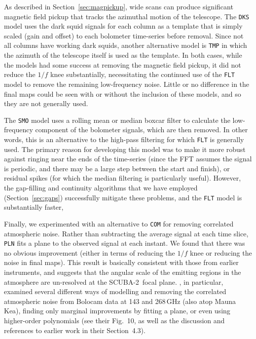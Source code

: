 \documentclass[useAMS,usenatbib,nofootinbib]{mn2e}
\newcommand{\scuba}{SCUBA-2}
\newcommand{\model}[1]{\texttt{#1}}
\begin{document}
As described in Section~\ref{sec:magpickup}, wide scans can produce
significant magnetic field pickup that tracks the azimuthal motion of
the telescope. The \model{DKS} model uses the dark squid signals for
each column as a template that is simply scaled (gain and offset) to
each bolometer time-series before removal. Since not all columns have
working dark squids, another alternative model is \model{TMP} in which
the azimuth of the telescope itself is used as the template. In both
cases, while the models had some success at removing the magnetic
field pickup, it did not reduce the $1/f$ knee substantially,
necessitating the continued use of the \model{FLT} model to remove the
remaining low-frequency noise. Little or no difference in the final
maps could be seen with or without the inclusion of these models, and
so they are not generally used.

The \model{SMO} model uses a rolling mean or median boxcar filter to
calculate the low-frequency component of the bolometer signals, which
are then removed. In other words, this is an alternative to the
high-pass filtering for which \model{FLT} is generally used. The
primary reason for developing this model was to make it more robust
against ringing near the ends of the time-series (since the FFT
assumes the signal is periodic, and there may be a large step between
the start and finish), or residual spikes (for which the median
filtering is particularly useful). However, the gap-filling and
continuity algorithms that we have employed (Section~\ref{sec:gaps})
successfully mitigate these problems, and the \model{FLT} model is
substantially faster,

Finally, we experimented with an alternative to \model{COM} for
removing correlated atmospheric noise. Rather than subtracting the
average signal at each time slice, \model{PLN} fits a plane to the
observed signal at each instant. We found that there was no obvious
improvement (either in terms of reducing the $1/f$ knee or reducing
the noise in final maps). This result is basically consistent with
those from earlier instruments, and suggests that the angular scale of
the emitting regions in the atmosphere are un-resolved at the \scuba\
focal plane. \citet{sayers2010}, in particular, examined several
different ways of modelling and removing the correlated atmospheric
noise from Bolocam data at 143 and 268\,GHz (also atop Mauna Kea),
finding only marginal improvements by fitting a plane, or even using
higher-order polynomials (see their Fig.~10, as well as the discussion
and references to earlier work in their Section~4.3).
\end{document}
